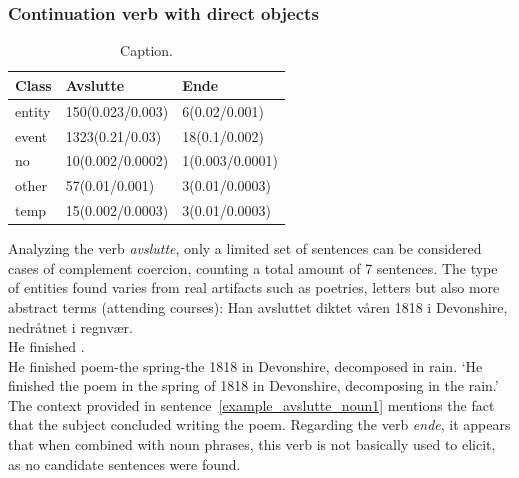 \documentclass{article}
\begin{document}
\subsubsection{Continuation verb with direct objects}
\begin{table}[h!]
    \centering
    \begin{tabular}{lll}
    \toprule
    Class &  Avslutte & Ende\\
    \midrule
    entity  & 150(0.023/0.003)  & 6(0.02/0.001) \\
    event   & 1323(0.21/0.03)   & 18(0.1/0.002)\\
    no      & 10(0.002/0.0002)  & 1(0.003/0.0001)\\
    other   & 57(0.01/0.001)    & 3(0.01/0.0003)\\
    temp    & 15(0.002/0.0003)  & 3(0.01/0.0003)\\
        \bottomrule
    \end{tabular}
    \caption{Caption.}
    \label{tab:cessation_semantic_noun}
\end{table}
Analyzing the verb \emph{avslutte}, only a limited set of sentences can be considered cases of complement coercion, counting a total amount of 7 sentences. The type of entities found varies from real artifacts such as poetries, letters but also more abstract terms (attending courses):
    \ea \label{example_avslutte_noun1} %
    \gll Han avsluttet diktet våren 1818 i Devonshire, nedråtnet i regnvær.\\
    He finished .\\
    He finished poem-the spring-the 1818 in Devonshire, decomposed in rain.
    \glt ‘He finished the poem in the spring of 1818 in Devonshire, decomposing in the rain.’
    \z
The context provided in sentence~\ref{example_avslutte_noun1} mentions the fact that the subject concluded writing the poem. 
Regarding the verb \emph{ende}, it appears that when combined with noun phrases, this verb is not basically used to elicit, as no candidate sentences were found.



\newpage



% 
% 

\end{document}
